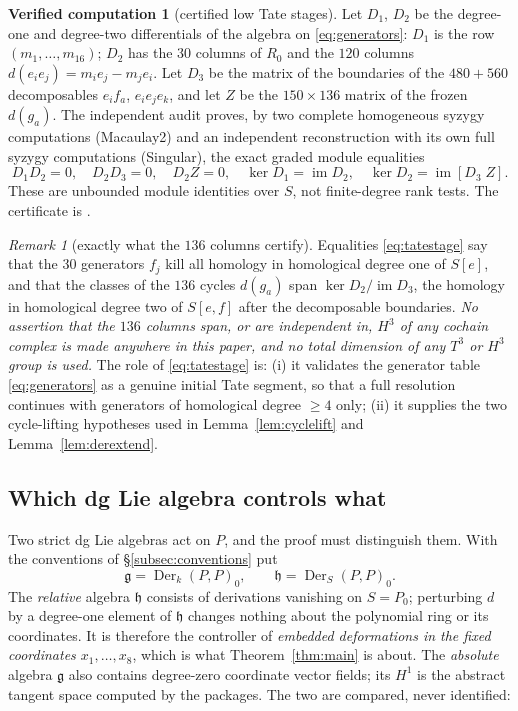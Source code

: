 \documentclass[11pt]{article}
\theoremstyle{definition}
\newtheorem{computation}[theorem]{Verified computation}
\theoremstyle{remark}
\newtheorem{remark}[theorem]{Remark}
\newcommand{\Der}{\operatorname{Der}}
\newcommand{\im}{\operatorname{im}}
\newcommand{\g}{\mathfrak g}
\newcommand{\h}{\mathfrak h}
\begin{document}
\begin{computation}[certified low Tate stages]\label{comp:tate}
Let $D_1$, $D_2$ be the degree-one and degree-two differentials of the
algebra on \eqref{eq:generators}: $D_1$ is the row $(m_1,\ldots,m_{16})$;
$D_2$ has the $30$ columns of $R_0$ and the $120$ columns
$d(e_ie_j)=m_ie_j-m_je_i$.  Let $D_3$ be the matrix of the boundaries of the
$480+560$ decomposables $e_if_a$, $e_ie_je_k$, and let $Z$ be the
$150\times136$ matrix of the frozen $d(g_a)$.  The independent audit
 proves, by two complete homogeneous syzygy
computations (Macaulay2) and an independent reconstruction with its own full
syzygy computations (Singular), the exact graded module equalities
\[
 D_1D_2=0,\quad D_2D_3=0,\quad D_2Z=0,\quad
 \ker D_1=\im D_2,\quad
 \ker D_2=\im[D_3\;Z].
\tag{2.2}\label{eq:tatestage}
\]
These are unbounded module identities over $S$, not finite-degree rank
tests.  The certificate is
.
\end{computation}

\begin{remark}[exactly what the $136$ columns certify]\label{rem:136}
Equalities \eqref{eq:tatestage} say that the $30$ generators $f_j$ kill all
homology in homological degree one of $S[e]$, and that the classes of the
$136$ cycles $d(g_a)$ span
$\ker D_2/\im D_3$, the homology in homological degree two of $S[e,f]$
after the decomposable boundaries.  \emph{No assertion that the $136$
columns span, or are independent in, $H^3$ of any cochain complex is made
anywhere in this paper, and no total dimension of any $T^3$ or $H^3$ group
is used.}  The role of \eqref{eq:tatestage} is: (i) it validates the
generator table \eqref{eq:generators} as a genuine initial Tate segment, so
that a full resolution continues with generators of homological degree
$\geq4$ only; (ii) it supplies the two cycle-lifting hypotheses used in
Lemma~\ref{lem:cyclelift} and Lemma~\ref{lem:derextend}.
\end{remark}

\subsection{Which dg Lie algebra controls what}\label{subsec:which}

Two strict dg Lie algebras act on $P$, and the proof must distinguish them.
With the conventions of \S\ref{subsec:conventions} put
\[
 \g=\Der_k(P,P)_0,
 \qquad
 \h=\Der_S(P,P)_0 .
\]
The \emph{relative} algebra $\h$ consists of derivations vanishing on
$S=P_0$; perturbing $d$ by a degree-one element of $\h$ changes nothing
about the polynomial ring or its coordinates.  It is therefore the
controller of \emph{embedded deformations in the fixed coordinates
$x_1,\ldots,x_8$}, which is what Theorem~\ref{thm:main} is about.  The
\emph{absolute} algebra $\g$ also contains degree-zero coordinate vector
fields; its $H^1$ is the abstract tangent space computed by the packages.
The two are compared, never identified:
\end{document}
